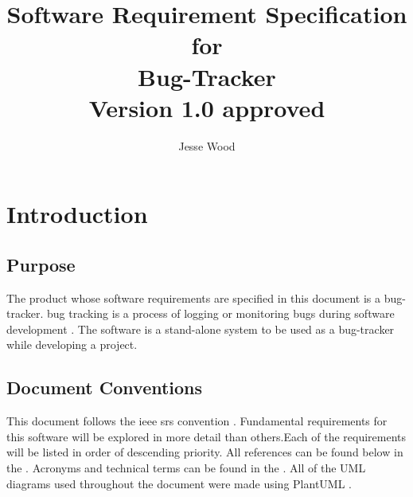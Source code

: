 \documentclass{article}
\newcommand{\comment}[1]{}
\begin{document}
\title{
	Software Requirement Specification \\
	for \\
	Bug-Tracker \\
	Version 1.0 approved
}
\author{Jesse Wood}
\maketitle
\newpage

\tableofcontents \label{contents}
\section{Introduction}
\subsection{Purpose}
\comment{
	Identify the product whose software requirements are specified in this document, including the revision or release number. Describe the scope of the product that is covered by the SRS. Particularly if this SRS describes only part of the system or a single subsytem.
	}
The product whose software requirements are specified in this document is a \Gls{bug}-tracker. \Gls{bug} tracking is a process of logging or monitoring bugs during software development \parencite{ibm20}. The software is a stand-alone system to be used as a bug-tracker while developing a project.
\subsection{Document Conventions}
\comment{
	Decribe any standards of typographical conventions that were followed when writing this \acrlong{srs}, such as fonts or highlighting that have special significance. For exmaple, state whether priorites for higher-level requirements are assumed to be inheritied by detailed requirements, or whether every requirement statement is to have its own priorities.
	}
This document follows the \acrshort{ieee} \acrshort{srs} convention \parencite{ieee20}. Fundamental requirements for this software will be explored in more detail than others.Each of the requirements will be listed in order of descending priority. All references can be found below in the . Acronyms and technical terms can be found in the . All of the UML diagrams used throughout the document were made using PlantUML \parencite{plantuml20}.
\end{document}
